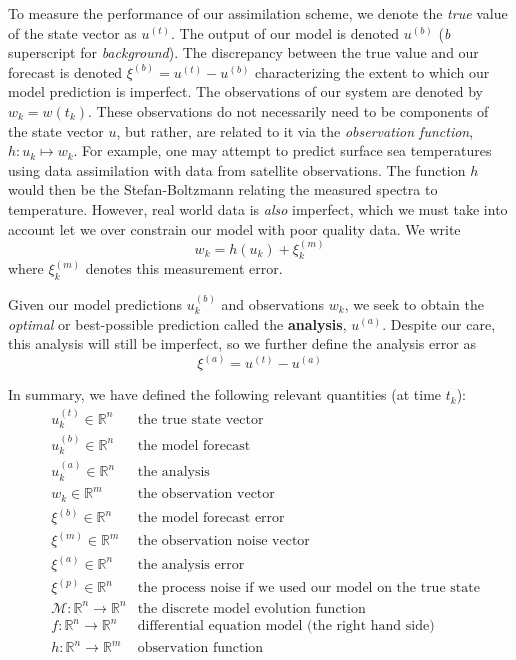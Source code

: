 To measure the performance of our assimilation scheme, we denote the \textit{true} value of the state vector as $u^{(t)}$. The output of our model is denoted $u^{(b)}$ (\textit{b} superscript for \textit{background}). The discrepancy between the true value and our forecast is denoted $\xi^{(b)} = u^{(t)} - u^{(b)}$ characterizing the extent to which our model prediction is imperfect. The observations of our system are denoted by $w_k = w(t_k)$. These observations do not necessarily need to be components of the state vector $u$, but rather, are related to it via the \textit{observation function}, $h:u_k\mapsto w_k$. For example, one may attempt to predict surface sea temperatures using data assimilation with data from satellite observations. The function $h$ would then be the Stefan-Boltzmann relating the measured spectra to temperature. However, real world data is \textit{also} imperfect, which we must take into account let we over constrain our model with poor quality data. We write
\begin{equation}
    w_k = h(u_k) + \xi_k^{(m)}
\end{equation}
where $\xi_k^{(m)}$ denotes this measurement error.

Given our model predictions $u_{k}^{(b)}$ and observations $w_k$, we seek to obtain the \textit{optimal} or best-possible prediction called the \textbf{analysis}, $u^{(a)}$. Despite our care, this analysis will still be imperfect, so we further define the analysis error as
\begin{equation}
\xi^{(a)} = u^{(t)} - u^{(a)}
\end{equation}

In summary, we have defined the following relevant quantities (at time $t_k$):
\begin{align}
  &u_k^{(t)} \in \mathbb{R}^n &\text{the true state vector} \\
  &u_k^{(b)} \in \mathbb{R}^n &\text{the model forecast} \\
  &u_k^{(a)} \in \mathbb{R}^n &\text{the analysis} \\
  &w_k \in \mathbb{R}^m &\text{the observation vector} \\
  &\xi^{(b)} \in \mathbb{R}^n &\text{the model forecast error}\\
  &\xi^{(m)} \in \mathbb{R}^m &\text{the observation noise vector}\\
  &\xi^{(a)} \in \mathbb{R}^n &\text{the analysis error}\\
  &\xi^{(p)} \in \mathbb{R}^n &\text{the process noise if we used our model on the true state}\\
  &\mathcal{M}:\mathbb{R}^n\to\mathbb{R}^n &\text{the discrete model evolution function}\\
  &f:\mathbb{R}^n\to\mathbb{R}^n &\text{differential equation model (the right hand side)}\\
  &h:\mathbb{R}^n\to\mathbb{R}^m  &\text{observation function}
\end{align}

